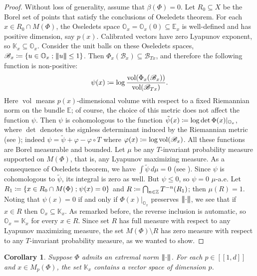 \documentclass[10pt]{amsart}
\let\mathcal\mathscr
\newcommand{\ldbrack}{[\![}
\newcommand{\rdbrack}{]\!]}
\def\vcentcolon{\mathrel{\mathop\ordinarycolon}}
\providecommand\ordinarycolon{:}
\providecommand*\coloneqq{\vcentcolon\mathrel{\mkern-1.2mu}=}
\theoremstyle{plain}
\newtheorem{corollary}[theorem]{Corollary}
\theoremstyle{definition}
\newcommand{\tribar}[1]{\mathopen{| {\kern -1.5pt} | {\kern -1.5pt} |} {#1}
\mathclose{| {\kern -1.5pt} | {\kern -1.5pt} |}}
\newcommand{\ZZ}{\mathbb{Z}}
\newcommand{\EE}{\mathbb{E}}
\newcommand{\KK}{\mathbb{K}}
\newcommand{\cB}{\mathcal{B}}
\newcommand{\st}{\;\mathord{;}\;}
\DeclareMathOperator{\vol}{vol}
\let\phi\varphi
\begin{document}
\begin{proof}
Without loss of generality, assume that $\beta(\Phi)=0$.
Let $R_0 \subseteq X$ be the Borel set of points that satisfy the conclusions of Oseledets theorem.
For each $x \in R_0 \cap M(\Phi)$, the Oseledets space $\mathbb{O}_x = \mathbb{O}_x(0) \subseteq \EE_x$ is well-defined and has positive dimension, say $p(x)$.
Calibrated vectors have zero Lyapunov exponent, so $\KK_x \subseteq \mathbb{O}_x$.
Consider the unit balls on these Oseledets spaces, \ie $\cB_x \coloneqq \{ u \in \mathbb{O}_x \st \tribar{u} \le 1\}$.
Then $\Phi_x(\cB_{x}) \subseteq \cB_{Tx}$, and therefore the following function is non-positive:
\[
\psi(x) \coloneqq \log \frac{\vol(\Phi_x(\cB_{x}))}{\vol(\cB_{Tx})}.
\]
Here $\vol$ means $p(x)$-dimensional volume with respect to a fixed Riemannian norm on the bundle $\EE$; of course, the choice of this metric does not affect the function $\psi$.
Then $\psi$ is cohomologous to the function
$\tilde \psi(x) \coloneqq \log \det \Phi(x)|_{\mathbb{O}_x}$, where $\det$ denotes the signless determinant induced by the Riemannian metric (see \cite[p.\,213]{Arnold}); indeed $\psi = \tilde \psi + \phi - \phi\circ T$ where $\phi(x) \coloneqq \log \vol(\cB_{x})$.
All these functions are Borel measurable and bounded.
Let $\mu$ be any $T$-invariant probability measure supported on $M(\Phi)$, that is, any Lyapunov maximizing measure.
As a consequence of Oseledets theorem, we have $\int \tilde\psi \, d\mu = 0$ (see \cite[p.\,214]{Arnold}). Since $\psi$ is cohomologous to $\tilde \psi$, its integral is zero as well. But $\psi \le 0$, so $\psi = 0$ $\mu$-a.e.
Let $R_1 \coloneqq \{ x \in R_0 \cap M(\Phi) \st \psi(x)=0 \}$ and $R \coloneqq \bigcap_{n \in \ZZ} T^{-n}(R_1)$; then $\mu (R) = 1$.
Noting that $\psi(x) = 0$ if and only if $\Phi(x)|_{\mathbb{O}_x}$ preserves $\tribar{\mathord{\cdot}}$, we see that if $x \in R$ then $\mathbb{O}_x \subseteq \KK_x$.
As remarked before, the reverse inclusion is automatic, so $\mathbb{O}_x = \KK_x$ for every $x \in R$.
Since set $R$ has full measure with respect to any Lyapunov maximizing measure, the set $M(\Phi) \setminus R$ has zero measure with respect to any $T$-invariant probability measure, as we wanted to show.
\end{proof}

\begin{corollary}\label{c.dimension}
Suppose $\Phi$ admits an extremal norm $ \tribar{\cdot}$.
For each $p \in \ldbrack 1, d \rdbrack$ and $x \in M_p(\Phi)$, the set $\KK_x$ contains a vector space of dimension $p$.
\end{corollary}
\end{document}
